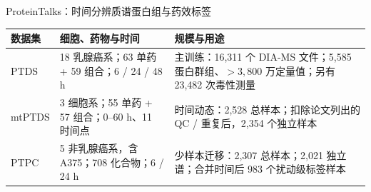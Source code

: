 \begin{frame}[t]{ProteinTalks：时间分辨质谱蛋白组与药效标签}
\bodyfont\renewcommand{\arraystretch}{1.14}
\begin{tabularx}{\textwidth}{@{}P{1.5cm}P{4.1cm}Y@{}}
\toprule\textbf{数据集}&\textbf{细胞、药物与时间}&\textbf{规模与用途}\\\midrule
PTDS & 18 乳腺癌系；63 单药 + 59 组合；6 / 24 / 48 h & 主训练：16,311 个 DIA-MS 文件；5,585 蛋白群组、$>3,800$ 万定量值；另有 23,482 次毒性测量\\
mtPTDS & 3 细胞系；55 单药 + 57 组合；0--60 h、11 时间点 & 时间动态：2,528 总样本；扣除论文列出的 QC / 重复后，2,354 个独立样本\\
PTPC & 5 非乳腺癌系，含 A375；708 化合物；6 / 24 h & 少样本迁移：2,307 总样本；2,021 独立谱；合并时间后 983 个扰动级标签样本\\
\bottomrule
\end{tabularx}
\end{frame}
